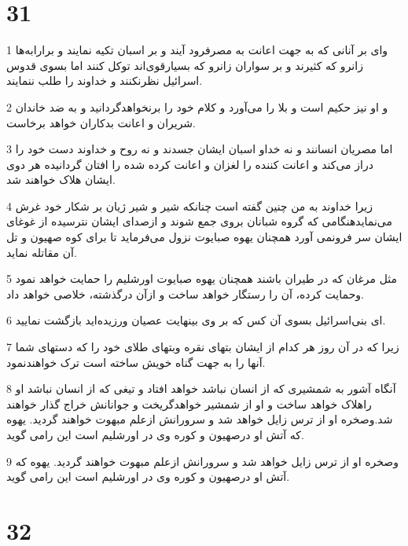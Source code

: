\chapter{31}

\par 1 وای بر آنانی که به جهت اعانت به مصرفرود آیند و بر اسبان تکیه نمایند و برارابه‌ها زانرو که کثیرند و بر سواران زانرو که بسیارقوی‌اند توکل کنند اما بسوی قدوس اسرائیل نظرنکنند و خداوند را طلب ننمایند.
\par 2 و او نیز حکیم است و بلا را می‌آورد و کلام خود را برنخواهدگردانید و به ضد خاندان شریران و اعانت بدکاران خواهد برخاست.
\par 3 اما مصریان انسانند و نه خداو اسبان ایشان جسدند و نه روح و خداوند دست خود را دراز می‌کند و اعانت کننده را لغزان و اعانت کرده شده را افتان گردانیده هر دوی ایشان هلاک خواهند شد.
\par 4 زیرا خداوند به من چنین گفته است چنانکه شیر و شیر ژیان بر شکار خود غرش می‌نمایدهنگامی که گروه شبانان بروی جمع شوند و ازصدای ایشان نترسیده از غوغای ایشان سر فرونمی آورد همچنان یهوه صبایوت نزول می‌فرماید تا برای کوه صهیون و تل آن مقاتله نماید.
\par 5 مثل مرغان که در طیران باشند همچنان یهوه صبایوت اورشلیم را حمایت خواهد نمود وحمایت کرده، آن را رستگار خواهد ساخت و ازآن درگذشته، خلاصی خواهد داد.
\par 6 ‌ای بنی‌اسرائیل بسوی آن کس که بر وی بینهایت عصیان ورزیده‌اید بازگشت نمایید.
\par 7 زیرا که در آن روز هر کدام از ایشان بتهای نقره وبتهای طلای خود را که دستهای شما آنها را به جهت گناه خویش ساخته است ترک خواهندنمود.
\par 8 آنگاه آشور به شمشیری که از انسان نباشد خواهد افتاد و تیغی که از انسان نباشد او راهلاک خواهد ساخت و او از شمشیر خواهدگریخت و جوانانش خراج گذار خواهند شد.وصخره او از ترس زایل خواهد شد و سرورانش ازعلم مبهوت خواهند گردید. یهوه که آتش او درصهیون و کوره وی در اورشلیم است این رامی گوید.
\par 9 وصخره او از ترس زایل خواهد شد و سرورانش ازعلم مبهوت خواهند گردید. یهوه که آتش او درصهیون و کوره وی در اورشلیم است این رامی گوید.
 
\chapter{32}

